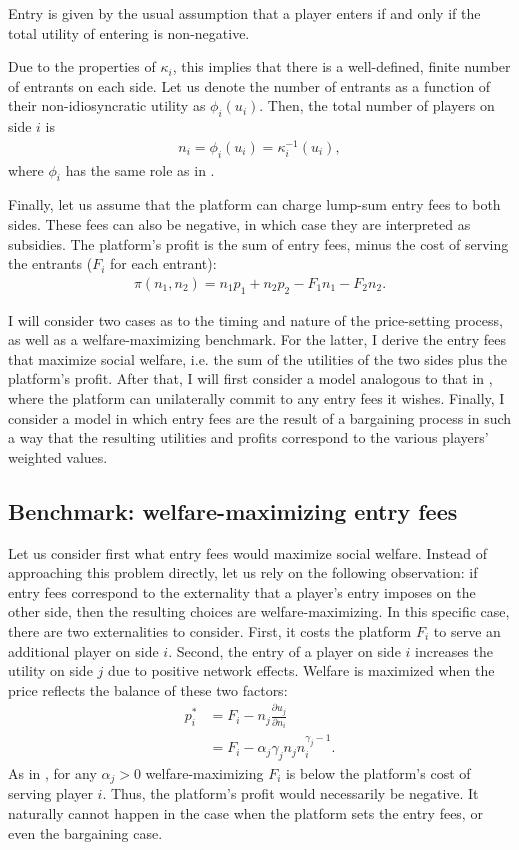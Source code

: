 \documentclass[a4paper]{article}
\begin{document}
Entry is given by the usual assumption that a player enters if and only if the total utility of entering is non-negative.

Due to the properties of $\kappa_i$, this implies that there is a well-defined, finite number of entrants on each side.
Let us denote the number of entrants as a function of their non-idiosyncratic utility as $\phi_i(u_i)$.
Then, the total number of players on side $i$ is 
\begin{align*}
    n_i = \phi_i(u_i) = \kappa_i^{-1}(u_i),
\end{align*}
where $\phi_i$ has the same role as in \textcite{armstrong2006competition}.

Finally, let us assume that the platform can charge lump-sum entry fees to both sides.
These fees can also be negative, in which case they are interpreted as subsidies.
The platform's profit is the sum of entry fees, minus the cost of serving the entrants ($F_i$ for each entrant):
\begin{align*}
    \pi(n_1, n_2) = n_1 p_1 + n_2 p_2 - F_1 n_1 - F_2 n_2.
\end{align*}

I will consider two cases as to the timing and nature of the price-setting process, as well as a welfare-maximizing benchmark.
For the latter, I derive the entry fees that maximize social welfare, i.e. the sum of the utilities of the two sides plus the platform's profit.
After that, I will first consider a model analogous to that in \textcite{armstrong2006competition}, where the platform can unilaterally commit to any entry fees it wishes.
Finally, I consider a model in which entry fees are the result of a bargaining process in such a way that the resulting utilities and profits correspond to the various players' weighted values.

\subsection{Benchmark: welfare-maximizing entry fees}

Let us consider first what entry fees would maximize social welfare.
Instead of approaching this problem directly, let us rely on the following observation: if entry fees correspond to the externality that a player's entry imposes on the other side, then the resulting choices are welfare-maximizing.
In this specific case, there are two externalities to consider.
First, it costs the platform $F_i$ to serve an additional player on side $i$.
Second, the entry of a player on side $i$ increases the utility on side $j$ due to positive network effects.
Welfare is maximized when the price reflects the balance of these two  factors:
\begin{align*}
    p_i^* &= F_i - n_j \frac{\partial u_j}{\partial n_i} \\
          &= F_i - \alpha_j \gamma_j n_j n_i^{\gamma_j - 1}.
\end{align*}
As in \textcite{armstrong2006competition}, for any $\alpha_j > 0$ welfare-maximizing $F_i$ is below the platform's cost of serving player $i$.
Thus, the platform's profit would necessarily be negative.
It naturally cannot happen in the case when the platform sets the entry fees, or even the bargaining case.
\end{document}
